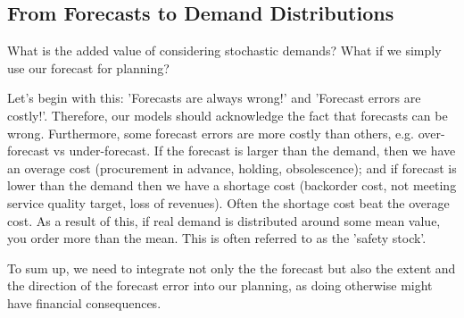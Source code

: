 %
%




\subsection{From Forecasts to Demand Distributions}

\begin{exercise}
What is the added value of considering stochastic demands? What if we simply use our forecast for planning?


\begin{solution}
Let's begin with this: 'Forecasts are always wrong!' and 'Forecast errors are costly!'. Therefore, our models should acknowledge the fact that forecasts can be wrong. Furthermore, some forecast errors are more costly than others, e.g. over-forecast vs under-forecast. If the forecast is larger than the demand, then we have an overage cost (procurement in advance, holding, obsolescence); and if forecast is lower than the demand then we have a shortage cost (backorder cost, not meeting service quality target, loss of revenues). Often the shortage cost beat the overage cost. As a result of this, if real demand is distributed around some mean value, you order more than the mean. This is often referred to as the 'safety stock'. 

To sum up, we need to integrate not only the the forecast but also the extent and the direction of the forecast error into our planning, as doing otherwise might have financial consequences. 
\end{solution}
\end{exercise}

